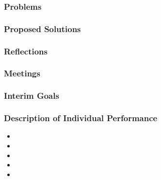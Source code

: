 \subsubsection{Problems}


\subsubsection{Proposed Solutions}


\subsubsection{Reflections}


\subsubsection{Meetings}


\subsubsection{Interim Goals}


\subsubsection{Description of Individual Performance}
    \begin{itemize}
      \item \performance{\martin}{
        
      }
      
      \item \performance{\felix}{
        
      }
      
      \item \performance{\hannes}{
        
      }
      
      \item \performance{\marcus}{
        
      }
      
      \item \performance{\jakob}{
        
      }
    \end{itemize}
